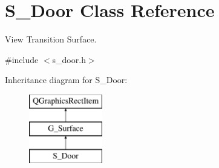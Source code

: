 \hypertarget{class_s___door}{}\section{S\+\_\+\+Door Class Reference}
\label{class_s___door}


View Transition Surface.  




{\ttfamily \#include $<$s\+\_\+door.\+h$>$}

Inheritance diagram for S\+\_\+\+Door\+:\begin{figure}[H]
\begin{center}
\leavevmode
\includegraphics[height=3.000000cm]{class_s___door}
\end{center}
\end{figure}
